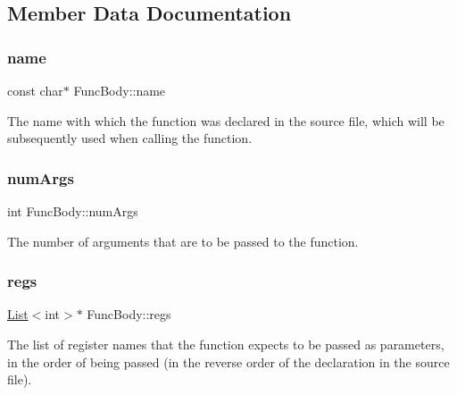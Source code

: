 \subsection{Member Data Documentation}
\mbox{\label{class_func_body_a48458c543d655ef7f25c3cbe3206e4b2}} 
\subsubsection{\texorpdfstring{name}{name}}
{\footnotesize\ttfamily const char$\ast$ Func\+Body\+::name\hspace{0.3cm}{\ttfamily [protected]}}

The name with which the function was declared in the source file, which will be subsequently used when calling the function. \mbox{\label{class_func_body_a659a0db3f1626e1e03a7fd86e1d38283}} 
\subsubsection{\texorpdfstring{num\+Args}{numArgs}}
{\footnotesize\ttfamily int Func\+Body\+::num\+Args\hspace{0.3cm}{\ttfamily [protected]}}

The number of arguments that are to be passed to the function. \mbox{\label{class_func_body_a48a90d46d3c6f767f1a6595c312af970}} 
\subsubsection{\texorpdfstring{regs}{regs}}
{\footnotesize\ttfamily \hyperlink{class_list}{List}$<$int$>$$\ast$ Func\+Body\+::regs\hspace{0.3cm}{\ttfamily [protected]}}

The list of register names that the function expects to be passed as parameters, in the order of being passed (in the reverse order of the declaration in the source file). \mbox{\label{class_func_body_ac471c93e30501d687d59aa752a5a312f}} 
